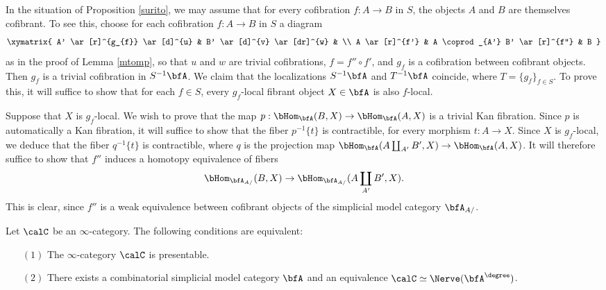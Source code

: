 \begin{remark}\label{surito2}
In the situation of Proposition \ref{surito}, we may assume that for every cofibration
$f: A \rightarrow B$ in $S$, the objects $A$ and $B$ are themselves cofibrant.
To see this, choose for each cofibration $f: A \rightarrow B$ in $S$ a diagram
$$ \xymatrix{ A' \ar[r]^{g_{f}} \ar[d]^{u} & B' \ar[d]^{v} \ar[dr]^{w} & \\
A \ar[r]^{f'} & A \coprod_{A'} B' \ar[r]^{f''} & B }$$
as in the proof of Lemma \ref{mtomp}, so that $u$ and $w$ are trivial cofibrations,
$f = f'' \circ f'$, and $g_f$ is a cofibration between cofibrant objects. Then $g_{f}$ is a trivial cofibration in $S^{-1} \bfA$. We claim that the localizations $S^{-1} \bfA$ and
$T^{-1} \bfA$ coincide, where $T = \{ g_{f} \}_{f \in S}$. To prove this, it will suffice to show that
for each $f \in S$, every $g_{f}$-local fibrant object $X \in \bfA$ is also $f$-local.

Suppose that $X$ is $g_{f}$-local. We wish to prove that the map
$p: \bHom_{\bfA}(B, X) \rightarrow \bHom_{\bfA}(A,X)$ is a trivial Kan fibration.
Since $p$ is automatically a Kan fibration, it will suffice to show that the fiber
$p^{-1} \{t\}$ is contractible, for every morphism $t: A \rightarrow X$. 
Since $X$ is $g_{f}$-local, we deduce that the fiber $q^{-1} \{t\}$ is contractible, where
$q$ is the projection map
$\bHom_{\bfA}( A \coprod_{A'} B', X) \rightarrow \bHom_{\bfA}(A, X)$. It will therefore
suffice to show that $f''$ induces a homotopy equivalence of fibers
$$ \bHom_{\bfA_{A/}}(B,X) \rightarrow \bHom_{ \bfA_{A/}}( A \coprod_{A'} B', X).$$
This is clear, since $f''$ is a weak equivalence between cofibrant objects
of the simplicial model category $\bfA_{A/}$.
\end{remark}

\begin{proposition}\label{notthereyet}
Let $\calC$ be an $\infty$-category. The following conditions are equivalent:
\begin{itemize}
\item[$(1)$] The $\infty$-category $\calC$ is presentable.
\item[$(2)$] There exists a combinatorial simplicial model category $\bfA$ and an equivalence
$\calC \simeq \Nerve( \bfA^{\degree})$. 
\end{itemize}
\end{proposition}

